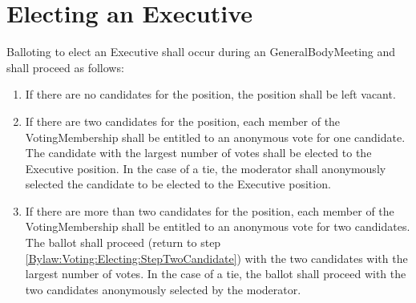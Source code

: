 \section{Electing an Executive}\label{Bylaw:Voting:Electing}
	Balloting to elect an \gls{Executive} shall occur during an \gls{GeneralBodyMeeting} and shall proceed as follows:
	\begin{enumerate}
		\item{If there are no candidates for the position, the position shall be left vacant.}
		\item{If there are two candidates for the position, each member of the \gls{VotingMembership} shall be entitled to an anonymous vote for one candidate. The candidate with the largest number of votes shall be elected to the \gls{Executive} position. In the case of a tie, the moderator shall anonymously selected the candidate to be elected to the \gls{Executive} position. \label{Bylaw:Voting:Electing:StepTwoCandidate}}
		\item{If there are more than two candidates for the position, each member of the \gls{VotingMembership} shall be entitled to an anonymous vote for two candidates. The ballot shall proceed (return to step \ref{Bylaw:Voting:Electing:StepTwoCandidate}) with the two candidates with the largest number of votes. In the case of a tie, the ballot shall proceed with the two candidates anonymously selected by the moderator.}
	\end{enumerate}

